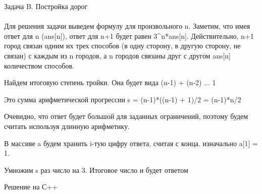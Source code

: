 {\large Задача B. Постройка дорог} 
\\
\\
Для решения задачи выведем формулу для произвольного n.
Заметим, что имея ответ для n (ans[n]), ответ для n+1 будет равен 3^n*ans[n].
Действительно, n+1 город связан одним их трех способов (в одну сторону, в другую сторону, не связан) с каждым из n городов, а n городов связаны друг с другом ans[n] количеством способов. 

Найдем итоговую степень тройки. Она будет вида (n-1) + (n-2) ... 1

Это сумма арифметической прогрессии s = (n-1)*((n-1) + 1)/2 = (n-1)*n/2

Очевидно, что ответ будет большой для заданных ограничений, поэтому будем считать используя длинную арифметику.

В массиве a будем хранить i-тую цифру ответа, считая с конца.
изначально a[1] = 1.

Умножим s раз число на 3. Итоговое число и будет ответом 


\newpage
{\large Решение на С++}
\\
\\

